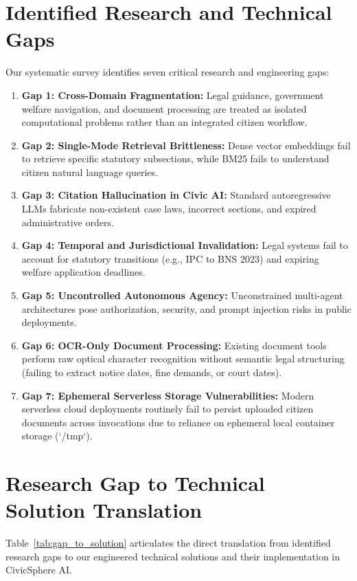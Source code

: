 \section{Identified Research and Technical Gaps}
\label{sec:research_gaps}
Our systematic survey identifies seven critical research and engineering gaps:
\begin{enumerate}
    \item \textbf{Gap 1: Cross-Domain Fragmentation:} Legal guidance, government welfare navigation, and document processing are treated as isolated computational problems rather than an integrated citizen workflow.
    \item \textbf{Gap 2: Single-Mode Retrieval Brittleness:} Dense vector embeddings fail to retrieve specific statutory subsections, while BM25 fails to understand citizen natural language queries.
    \item \textbf{Gap 3: Citation Hallucination in Civic AI:} Standard autoregressive LLMs fabricate non-existent case laws, incorrect sections, and expired administrative orders.
    \item \textbf{Gap 4: Temporal and Jurisdictional Invalidation:} Legal systems fail to account for statutory transitions (e.g., IPC to BNS 2023) and expiring welfare application deadlines.
    \item \textbf{Gap 5: Uncontrolled Autonomous Agency:} Unconstrained multi-agent architectures pose authorization, security, and prompt injection risks in public deployments.
    \item \textbf{Gap 6: OCR-Only Document Processing:} Existing document tools perform raw optical character recognition without semantic legal structuring (failing to extract notice dates, fine demands, or court dates).
    \item \textbf{Gap 7: Ephemeral Serverless Storage Vulnerabilities:} Modern serverless cloud deployments routinely fail to persist uploaded citizen documents across invocations due to reliance on ephemeral local container storage (`/tmp`).
\end{enumerate}

\section{Research Gap to Technical Solution Translation}
\label{sec:gap_to_solution}
Table~\ref{tab:gap_to_solution} articulates the direct translation from identified research gaps to our engineered technical solutions and their implementation in CivicSphere AI.

